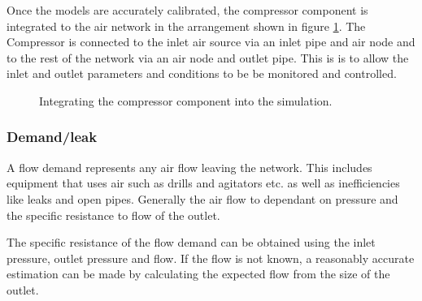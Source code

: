 		\par
		Once the models are accurately calibrated, the compressor component is integrated to the air network in the arrangement shown in figure \ref{fig: Compressor models}. The Compressor is connected to the inlet air source via an inlet pipe and air node and to the rest of the network via an air node and outlet pipe. This is is to allow the inlet and outlet parameters and conditions to be be monitored and controlled.
		\begin{figure}[h]
			\centering
			\caption{Integrating the compressor component into the simulation.}
			\label{fig: Compressor models}
		\end{figure}		

		\subsubsection{Demand/leak}
			A flow demand represents any air flow leaving the network. This includes equipment that uses air such as drills and agitators etc. as well as inefficiencies like leaks and open pipes. Generally  the air flow to dependant on pressure and the specific resistance to flow of the outlet. 
			\par 
			The specific resistance of the flow demand can be obtained using the inlet pressure, outlet pressure and flow. If the flow is not known, a reasonably accurate estimation can be made by calculating the expected flow from the size of the outlet.
